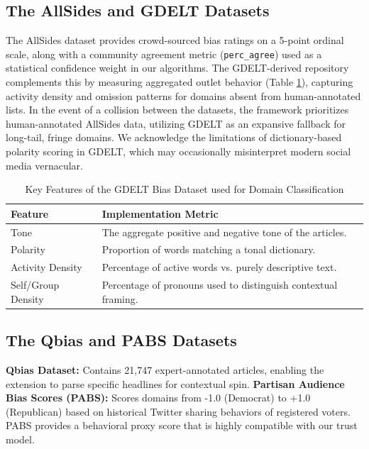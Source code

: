 \documentclass[10pt, conference, compsoc]{IEEEtran}
\begin{document}
\subsection{The AllSides and GDELT Datasets}
The AllSides dataset provides crowd-sourced bias ratings on a 5-point ordinal scale, along with a community agreement metric (\texttt{perc\_agree}) used as a statistical confidence weight in our algorithms. The GDELT-derived repository complements this by measuring aggregated outlet behavior (Table \ref{tab:gdelt_features}), capturing activity density and omission patterns for domains absent from human-annotated lists. In the event of a collision between the datasets, the framework prioritizes human-annotated AllSides data, utilizing GDELT as an expansive fallback for long-tail, fringe domains. We acknowledge the limitations of dictionary-based polarity scoring in GDELT, which may occasionally misinterpret modern social media vernacular.

\begin{table}[htbp]
\caption{Key Features of the GDELT Bias Dataset used for Domain Classification}
\begin{center}
\begin{tabular}{p{2.5cm} p{5.5cm}}
\toprule
\textbf{Feature} & \textbf{Implementation Metric} \\
\midrule
Tone & The aggregate positive and negative tone of the articles. \\
Polarity & Proportion of words matching a tonal dictionary. \\
Activity Density & Percentage of active words vs. purely descriptive text. \\
Self/Group Density & Percentage of pronouns used to distinguish contextual framing. \\
\bottomrule
\end{tabular}
\label{tab:gdelt_features}
\end{center}
\end{table}

\subsection{The Qbias and PABS Datasets}
\textbf{Qbias Dataset:} Contains 21,747 expert-annotated articles, enabling the extension to parse specific headlines for contextual spin.
\textbf{Partisan Audience Bias Scores (PABS):} Scores domains from -1.0 (Democrat) to +1.0 (Republican) based on historical Twitter sharing behaviors of registered voters. PABS provides a behavioral proxy score that is highly compatible with our trust model.
\end{document}
